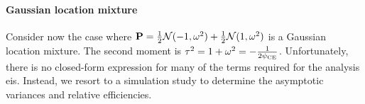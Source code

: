 \begin{example}
    
    \paragraph{Gaussian location mixture}
    Consider now the case where $\P = \frac{1}{2} \mathcal N(-1, \omega^{2}) + \frac{1}{2}\mathcal N(1, \omega^{2})$ is a Gaussian location mixture. The second moment is $\tau^{2} = 1 + \omega^{2} = -\frac{1}{2\pce}$. Unfortunately, there is no closed-form expression for many of the terms required for the analysis \gls{eis}. Instead, we resort to a simulation study to determine the asymptotic variances and relative efficiencies.

    
\end{example}

